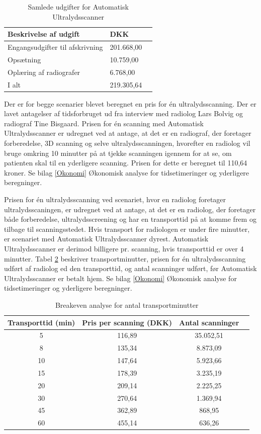 \begin{table}[htb]
\centering
\begin{tabular}{ | l | l | p{} | }
\hline
\textbf{Beskrivelse af udgift} & \textbf{DKK} \\\hline
Engangsudgifter til afskrivning & 201.668,00 \\\hline
Opsætning & 10.759,00 \\\hline
Oplæring af radiografer & 6.768,00 \\\hline
I alt & 219.305,64 \\\hline
\end{tabular}
\caption{Samlede udgifter for Automatisk Ultralydsscanner}
\label{FasteOmkostninger}
\end{table}

Der er for begge scenarier blevet beregnet en pris for én ultralydsscanning. Der er lavet antagelser af tidsforbruget ud fra interview med radiolog Lars Bolvig og radiograf Tine Bisgaard. Prisen for én scanning med Automatisk Ultralydsscanner er udregnet ved at antage, at det er en radiograf, der foretager forberedelse, 3D scanning og selve ultralydsscanningen, hvorefter en radiolog vil bruge omkring 10 minutter på at tjekke scanningen igennem for at se, om patienten skal til en yderligere scanning. Prisen for dette er beregnet til 110,64 kroner. Se bilag \ref{Okonomi} Økonomisk analyse for tidsetimeringer og yderligere beregninger. 

Prisen for én ultralydsscanning ved scenariet, hvor en radiolog foretager ultralydsscaningen, er udregnet ved at antage, at det er en radiolog, der foretager både forberedelse, ultralydsscreening og har en transporttid på at komme frem og tilbage til scanningsstedet. Hvis transport for radiologen er under fire minutter, er scenariet med Automatisk Ultralydsscanner dyrest. Automatisk Ultralydsscanner er derimod billigere pr. scanning, hvis transporttid er over 4 minutter. Tabel \ref{Breakeven} beskriver transportminutter, prisen for én ultralydsscanning udført af radiolog ed den transporttid, og antal scanninger udført, før Automatisk Ultralydsscanner er betalt hjem. Se bilag \ref{Okonomi} Økonomisk analyse for tidsetimeringer og yderligere beregninger. 

\begin{table}[H]
\centering
\begin{tabular}{ | c | c | c | p{} | }
\hline
\textbf{Transporttid (min)} & \textbf{Pris per scanning (DKK)} & \textbf{Antal scanninger} \\\hline
5 & 116,89 & 35.052,51 \\\hline
8 & 135,34 & 8.873,09\\\hline
10 & 147,64 & 5.923,66\\\hline
15 & 178,39 & 3.235,19 \\\hline
20 & 209,14 & 2.225,25\\\hline
30 & 270,64 & 1.369,94\\\hline
45 & 362,89 & 868,95 \\\hline
60 & 455,14 & 636,26 \\\hline
\end{tabular}
\caption{Breakeven analyse for antal transportminutter}
\label{Breakeven}
\end{table}

